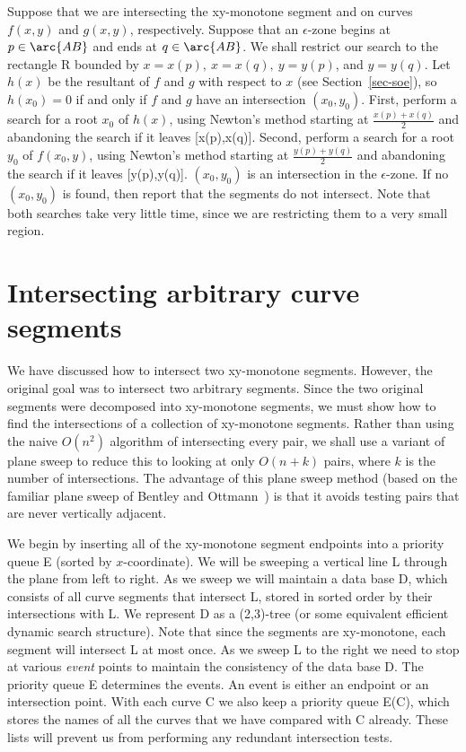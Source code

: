 Suppose that we are intersecting the xy-monotone segment  and  on curves
$f(x,y)$ and $g(x,y)$, respectively.
Suppose that an $\epsilon$-zone begins at $p \in \arc{AB}$ and ends at $q \in \arc{AB}$.
We shall restrict our search to the rectangle R bounded by $x = x(p),\ x = x(q),\ y = y(p)$,
and $y = y(q)$.
Let $h(x)$ be the resultant of $f$ and $g$ with respect to $x$ (see Section~\ref{sec-soe}),
so $h(x_{0}) = 0$ if and only if $f$ and $g$ have an intersection $(x_{0},y_{0})$.
First, perform a search for a root $x_{0}$ of $h(x)$, using Newton's method starting at
$\frac{x(p)+x(q)}{2}$ and abandoning the search if it leaves [x(p),x(q)].
Second, perform a search for a root $y_{0}$ of $f(x_{0},y)$, using Newton's method starting at
$\frac{y(p)+y(q)}{2}$ and abandoning the search if it leaves [y(p),y(q)].
$(x_{0},y_{0})$ is an intersection in the $\epsilon$-zone.
If no $(x_{0},y_{0})$ is found, then report that the segments do not intersect.
Note that both searches take very little time, since we are restricting them to a very
small region.

\section{Intersecting arbitrary curve segments}
\label{sec-sweep}

We have discussed how to intersect two xy-monotone segments.
However, the original goal was to intersect two arbitrary segments.
Since the two original segments were decomposed into xy-monotone segments, we must show
how to find the intersections of a collection of xy-monotone segments.
Rather than using the naive $O(n^{2})$ algorithm of intersecting every pair, 
we shall use a variant of plane sweep to reduce this to looking at only $O(n + k)$ pairs,
where $k$ is the number of intersections.
The advantage of this plane sweep method (based on the familiar plane sweep of Bentley 
and Ottmann~\cite{BeO79}) is that it avoids testing pairs that are never vertically adjacent.

We begin by inserting all of the xy-monotone segment endpoints into a priority queue E
(sorted by $x$-coordinate).
We will be sweeping a vertical line L through the plane from left to right.
As we sweep we will maintain a data base D, which consists of all curve
segments that intersect L, stored in sorted order by their intersections with L.
We represent D as a (2,3)-tree \cite{ahu74} (or some equivalent efficient dynamic
search structure).
Note that since the segments are xy-monotone, each segment will intersect L at most
once.  As we sweep L to the right we need to stop at various {\em event} points to 
maintain the consistency of the data base D.
The priority queue E determines the events.
An event is either an endpoint or an intersection point.
With each curve C we also keep a priority queue E(C), which stores the names of 
all the curves that we have compared with C already.
These lists will prevent us from performing any redundant intersection tests.

